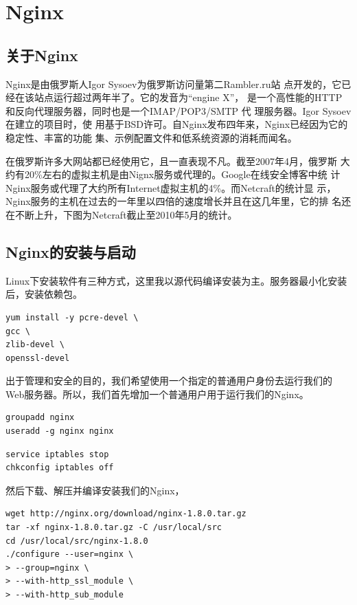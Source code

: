 \chapter{Nginx}
\label{chap:nginx}

\section{关于Nginx}
\label{subsec:AboutNginx}

Nginx是由俄罗斯人Igor Sysoev为俄罗斯访问量第二Rambler.ru站
点开发的，它已经在该站点运行超过两年半了。它的发音为“engine
X”， 是一个高性能的HTTP和反向代理服务器，同时也是一个IMAP/POP3/SMTP 代
理服务器。Igor Sysoev在建立的项目时，使
用基于BSD许可。自Nginx发布四年来，Nginx已经因为它的稳定性、丰富的功能
集、示例配置文件和低系统资源的消耗而闻名。

在俄罗斯许多大网站都已经使用它，且一直表现不凡。截至2007年4月，俄罗斯
大约有20\%左右的虚拟主机是由Nignx服务或代理的。Google在线安全博客中统
计Nginx服务或代理了大约所有Internet虚拟主机的4\%。而Netcraft的统计显
示，Nginx服务的主机在过去的一年里以四倍的速度增长并且在这几年里，它的排
名还在不断上升，下图为Netcraft截止至2010年5月的统计。

\section{Nginx的安装与启动}
\label{subsec:InstallAndStartNginx}

Linux下安装软件有三种方式，这里我以源代码编译安装为主。服务器最小化安装
后，安装依赖包。

\begin{verbatim}
yum install -y pcre-devel \
gcc \
zlib-devel \
openssl-devel
\end{verbatim}

出于管理和安全的目的，我们希望使用一个指定的普通用户身份去运行我们的
Web服务器。所以，我们首先增加一个普通用户用于运行我们的Nginx。

\begin{verbatim}
groupadd nginx
useradd -g nginx nginx
\end{verbatim}

\begin{verbatim}
service iptables stop
chkconfig iptables off
\end{verbatim}

然后下载、解压并编译安装我们的Nginx，

\begin{verbatim}
wget http://nginx.org/download/nginx-1.8.0.tar.gz
tar -xf nginx-1.8.0.tar.gz -C /usr/local/src
cd /usr/local/src/nginx-1.8.0
./configure --user=nginx \
> --group=nginx \
> --with-http_ssl_module \
> --with-http_sub_module
\end{verbatim}

